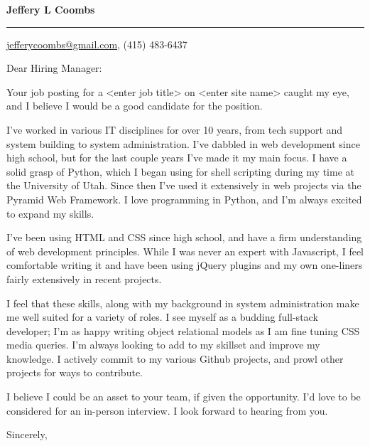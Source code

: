 \documentclass{letter}
\begin{document}
\signature{Jeffery L Coombs}
\longindentation=8pt
\let\raggedleft\raggedright
\headsep=20pt

\begin{letter}{}

\begin{flushleft}
 {\large\bf Jeffery L Coombs}
\end{flushleft}
\medskip\hrule height 1pt
\begin{flushright}
 \hfill \href{mailto:jefferycoombs@gmail.com}{jefferycoombs@gmail.com}, (415) 483-6437 
\end{flushright}
\vfill

\opening{Dear Hiring Manager:}

\noindent Your job posting for a <enter job title> on <enter site name> caught my eye, and I believe I would be a good candidate for the position.  

\noindent I've worked in various IT disciplines for over 10 years, from tech support and system building to system administration. I've dabbled in web development since high school, but for the last couple years I've made it my main focus. I have a solid grasp of Python, which I began using for shell scripting during my time at the University of Utah. Since then I've used it extensively in web projects via the Pyramid Web Framework. I love programming in Python, and I'm always excited to expand my skills. 

\noindent I've been using HTML and CSS since high school, and have a firm understanding of web development principles. While I was never an expert with Javascript, I feel comfortable writing it and have been using jQuery plugins and my own one-liners fairly extensively in recent projects. 

\noindent I feel that these skills, along with my background in system administration make me well suited for a variety of roles. I see myself as a budding full-stack developer; I'm as happy writing object relational models as I am fine tuning CSS media queries. I'm always looking to add to my skillset and improve my knowledge. I actively commit to my various Github projects, and prowl other projects for ways to contribute.

\noindent I believe I could be an asset to your team, if given the opportunity. I'd love to be considered for an in-person interview. I look forward to hearing from you.

\closing{Sincerely,}
\end{letter}
\end{document}
